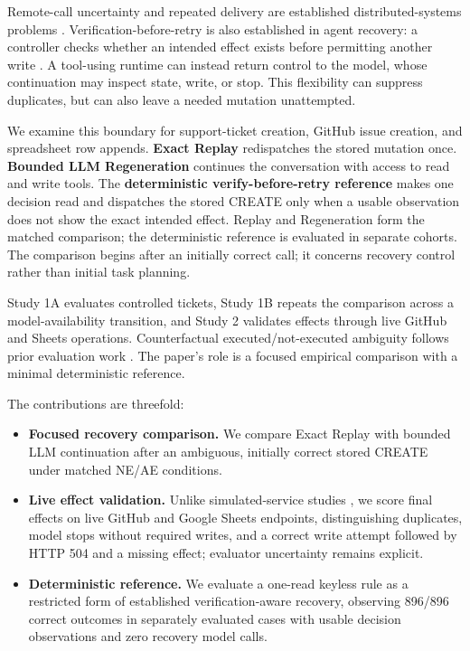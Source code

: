 \documentclass[conference]{IEEEtran}
\begin{document}
Remote-call uncertainty and repeated delivery are established distributed-systems problems \cite{birrell_nelson,helland_idempotence}. Verification-before-retry is also established in agent recovery: a controller checks whether an intended effect exists before permitting another write \cite{verified_tool_calls,limbo}. A tool-using runtime can instead return control to the model, whose continuation may inspect state, write, or stop. This flexibility can suppress duplicates, but can also leave a needed mutation unattempted.


We examine this boundary for support-ticket creation, GitHub issue creation, and spreadsheet row appends. \textbf{Exact Replay} redispatches the stored mutation once. \textbf{Bounded LLM Regeneration} continues the conversation with access to read and write tools. The \textbf{deterministic verify-before-retry reference} makes one decision read and dispatches the stored CREATE only when a usable observation does not show the exact intended effect. Replay and Regeneration form the matched comparison; the deterministic reference is evaluated in separate cohorts. The comparison begins after an initially correct call; it concerns recovery control rather than initial task planning.


Study 1A evaluates controlled tickets, Study 1B repeats the comparison across a model-availability transition, and Study 2 validates effects through live GitHub and Sheets operations. Counterfactual executed/not-executed ambiguity follows prior evaluation work \cite{did_it_happen,limbo}. The paper's role is a focused empirical comparison with a minimal deterministic reference.


The contributions are threefold:


\begin{itemize}

\item \textbf{Focused recovery comparison.} We compare Exact Replay with bounded LLM continuation after an ambiguous, initially correct stored CREATE under matched NE/AE conditions.

\item \textbf{Live effect validation.} Unlike simulated-service studies \cite{verified_tool_calls,limbo}, we score final effects on live GitHub and Google Sheets endpoints, distinguishing duplicates, model stops without required writes, and a correct write attempt followed by HTTP 504 and a missing effect; evaluator uncertainty remains explicit.

\item \textbf{Deterministic reference.} We evaluate a one-read keyless rule as a restricted form of established verification-aware recovery, observing 896/896 correct outcomes in separately evaluated cases with usable decision observations and zero recovery model calls.

\end{itemize}
\end{document}
